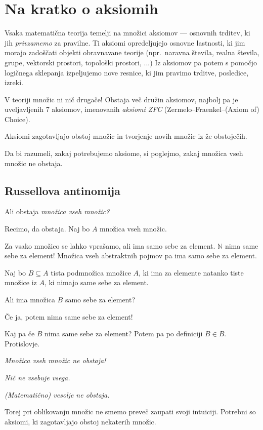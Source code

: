\documentclass[11pt,paper=b5,footinclude,headinclude]{scrbook} %
\begin{document}
\section{Na kratko o aksiomih}

Vsaka matematična teorija temelji na množici aksiomov --- osnovnih trditev, ki jih {\em privzamemo} za pravilne. Ti aksiomi opredeljujejo osnovne lastnosti, ki jim morajo zadoščati objekti obravnavane teorije (npr.~naravna števila, realna števila, grupe, vektorski prostori, topološki prostori, ...) Iz aksiomov pa potem s pomočjo logičnega sklepanja izpeljujemo nove resnice, ki jim pravimo trditve, posledice, izreki.

V teoriji množic ni nič drugače! Obstaja več družin aksiomov, najbolj pa je uveljavljenih 7 aksiomov, imenovanih {\em aksiomi ZFC} (Zermelo--Fraenkel--(Axiom of) Choice).

Aksiomi zagotavljajo obstoj množic in tvorjenje novih množic iz že obstoječih.

Da bi razumeli, zakaj potrebujemo aksiome, si poglejmo, zakaj množica vseh
množic ne obstaja.

\subsection{Russellova antinomija}

Ali obstaja {\em množica vseh množic?}

Recimo, da obstaja. Naj bo $A$ množica vseh množic.

Za vsako množico se lahko vprašamo, ali ima samo sebe za element. $\mathbb{N}$ nima same sebe za element! Množica vseh abstraktnih pojmov pa ima samo sebe za element.

Naj bo $B\subseteq A$ tista podmnožica množice $A$, ki ima za elemente natanko tiste množice iz $A$, ki nimajo same sebe za element.

Ali ima množica $B$ samo sebe za element?

Če ja, potem nima same sebe za element!

Kaj pa če $B$ nima same sebe za element? Potem pa po definiciji $B\in B$.
Protislovje.

{\em Množica vseh množic ne obstaja!}

{\centerline\em Nič ne vsebuje vsega.} \textit{(Matematično) vesolje ne obstaja.}

\medskip
Torej pri oblikovanju množic ne smemo preveč zaupati svoji intuiciji. Potrebni so aksiomi, ki zagotavljajo obstoj nekaterih množic.
\end{document}
